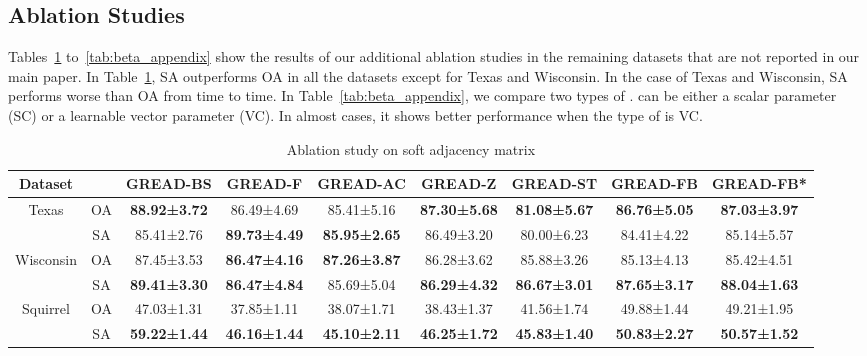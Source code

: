 \documentclass{article}
\theoremstyle{plain}
\theoremstyle{definition}
\theoremstyle{remark}
\newcommand{\std}{\scriptsize{}}
\begin{document}
\subsection{Ablation Studies}\label{a:ablation}
Tables~\ref{tab:soft_appendix} to~\ref{tab:beta_appendix} show the results of our additional ablation studies in the remaining datasets that are not reported in our main paper. In Table~\ref{tab:soft_appendix}, SA outperforms OA in all the datasets except for Texas and Wisconsin. In the case of Texas and Wisconsin, SA performs worse than OA from time to time. In Table~\ref{tab:beta_appendix}, we compare two types of .  can be either a scalar parameter (SC) or a learnable vector parameter (VC). In almost cases, it shows better performance when the type of  is VC.

 \begin{table}[ht!]
     \small
     \centering
\caption{Ablation study on soft adjacency matrix}
     \label{tab:soft_appendix}
     \begin{tabular}{cc cccc ccc}\toprule
        Dataset &  &  GREAD-BS & GREAD-F & GREAD-AC & GREAD-Z & GREAD-ST & GREAD-FB & GREAD-FB*\\ 
        \midrule \multirow{2}{*}{Texas}
        & OA   &  \textbf{88.92\std{±3.72}} & 86.49\std{±4.69} & 85.41\std{±5.16} & \textbf{87.30\std{±5.68}} & \textbf{81.08\std{±5.67}} & \textbf{86.76\std{±5.05}} & \textbf{87.03\std{±3.97}}\\
        & SA   &  85.41\std{±2.76} & \textbf{89.73\std{±4.49}} & \textbf{85.95\std{±2.65}} & 86.49\std{±3.20} & 80.00\std{±6.23} & 84.41\std{±4.22} & 85.14\std{±5.57}\\
        \midrule \multirow{2}{*}{Wisconsin}
        & OA   &  87.45\std{±3.53} & \textbf{86.47\std{±4.16}} & \textbf{87.26\std{±3.87}} & 86.28\std{±3.62} & 85.88\std{±3.26} & 85.13\std{±4.13} & 85.42\std{±4.51}\\
        & SA   &  \textbf{89.41\std{±3.30}} & \textbf{86.47\std{±4.84}} & 85.69\std{±5.04} & \textbf{86.29\std{±4.32}} & \textbf{86.67\std{±3.01}} & \textbf{87.65\std{±3.17}} & \textbf{88.04\std{±1.63}}\\
        \midrule \multirow{2}{*}{Squirrel}
        & OA   &  47.03\std{±1.31} & 37.85\std{±1.11} & 38.07\std{±1.71} & 38.43\std{±1.37} & 41.56\std{±1.74} & 49.88\std{±1.44} & 49.21\std{±1.95}\\
        & SA   &  \textbf{59.22\std{±1.44}} & \textbf{46.16\std{±1.44}} & \textbf{45.10\std{±2.11}} & \textbf{46.25\std{±1.72}} & \textbf{45.83\std{±1.40}} & \textbf{50.83\std{±2.27}} & \textbf{50.57\std{±1.52}}\\

\end{tabular}
\end{table}
\end{document}
